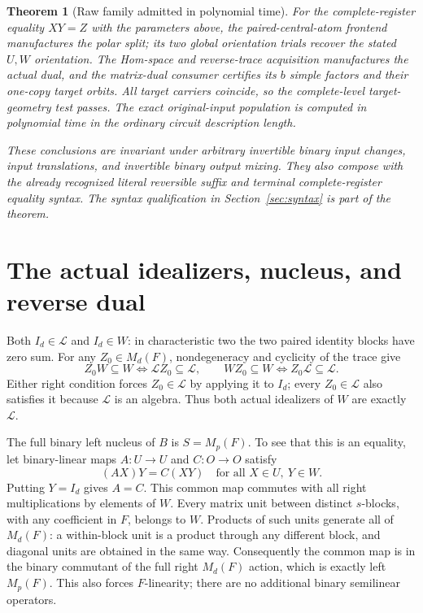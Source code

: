\documentclass[11pt]{article}
\newtheorem{theorem}{Theorem}\newtheorem{lemma}{Lemma}
\begin{document}
\begin{theorem}[Raw family admitted in polynomial time]
For the complete-register equality $XY=Z$ with the parameters above,
the paired-central-atom frontend manufactures the polar split; its two
global orientation trials recover the stated $U,W$ orientation. The
Hom-space and reverse-trace acquisition manufactures the actual dual,
and the matrix-dual consumer certifies its $b$ simple factors and their
one-copy target orbits. All target carriers coincide, so the complete-level
target-geometry test passes. The exact original-input population is
computed in polynomial time in the ordinary circuit description length.

These conclusions are invariant under arbitrary invertible binary input
changes, input translations, and invertible binary output mixing. They
also compose with the already recognized literal reversible suffix and
terminal complete-register equality syntax. The syntax qualification in
Section~\ref{sec:syntax} is part of the theorem.
\end{theorem}

\section{The actual idealizers, nucleus, and reverse dual}

Both $I_d\in\mathcal L$ and $I_d\in W$: in characteristic two the two
paired identity blocks have zero sum. For any $Z_0\in M_d(F)$,
nondegeneracy and cyclicity of the trace give
\[
 Z_0W\subseteq W\iff \mathcal L Z_0\subseteq\mathcal L,
 \qquad
 WZ_0\subseteq W\iff Z_0\mathcal L\subseteq\mathcal L.
\]
Either right condition forces $Z_0\in\mathcal L$ by applying it to $I_d$;
every $Z_0\in\mathcal L$ also satisfies it because $\mathcal L$ is an
algebra. Thus both actual idealizers of $W$ are exactly $\mathcal L$.

The full binary left nucleus of $B$ is $S=M_p(F)$. To see that this is an
equality, let binary-linear maps $A:U\to U$ and $C:O\to O$ satisfy
\[
 (AX)Y=C(XY)\quad\text{for all }X\in U,\ Y\in W.
\]
Putting $Y=I_d$ gives $A=C$. This common map commutes with all right
multiplications by elements of $W$. Every matrix unit between distinct
$s$-blocks, with any coefficient in $F$, belongs to $W$. Products of such
units generate all of $M_d(F)$: a within-block unit is a product through
any different block, and diagonal units are obtained in the same way.
Consequently the common map is in the binary commutant of the full right
$M_d(F)$ action, which is exactly left $M_p(F)$. This also forces
$F$-linearity; there are no additional binary semilinear operators.
\end{document}
